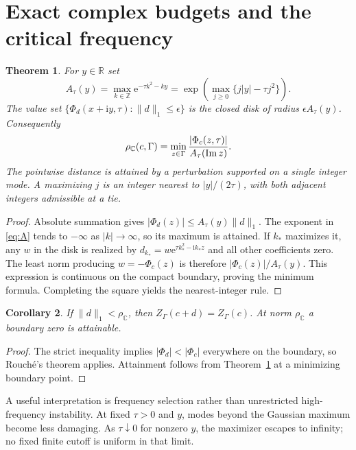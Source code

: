 \documentclass[11pt]{article}
\newtheorem{theorem}{Theorem}\newtheorem{proposition}[theorem]{Proposition}\newtheorem{corollary}[theorem]{Corollary}\newtheorem{lemma}[theorem]{Lemma}
\newcommand{\C}{\mathbb C}\newcommand{\R}{\mathbb R}\newcommand{\Z}{\mathbb Z}\newcommand{\e}{\mathrm e}\newcommand{\ii}{\mathrm i}\newcommand{\dd}{\,\mathrm d}
\begin{document}
\section{Exact complex budgets and the critical frequency}
\begin{theorem}\label{thm:complex}
For $y\in\R$ set
\begin{equation}\label{eq:A}
 A_\tau(y)=\max_{k\in\Z}\e^{-\tau k^2-ky}
 =\exp\!\left(\max_{j\ge0}\{j|y|-\tau j^2\}\right).
\end{equation}
The value set $\{\Phi_d(x+\ii y,\tau):\|d\|_1\le\epsilon\}$ is the closed disk of radius $\epsilon A_\tau(y)$. Consequently
\begin{equation}\label{eq:complexradius}
 \rho_\C(c,\Gamma)=\min_{z\in\Gamma}\frac{|\Phi_c(z,\tau)|}{A_\tau(\Ima z)}.
\end{equation}
The pointwise distance is attained by a perturbation supported on a single integer mode. A maximizing $j$ is an integer nearest to $|y|/(2\tau)$, with both adjacent integers admissible at a tie.
\end{theorem}
\begin{proof}
Absolute summation gives $|\Phi_d(z)|\le A_\tau(y)\|d\|_1$. The exponent in \eqref{eq:A} tends to $-\infty$ as $|k|\to\infty$, so its maximum is attained. If $k_*$ maximizes it, any $w$ in the disk is realized by $d_{k_*}=w\e^{\tau k_*^2-\ii k_*z}$ and all other coefficients zero. The least norm producing $w=-\Phi_c(z)$ is therefore $|\Phi_c(z)|/A_\tau(y)$. This expression is continuous on the compact boundary, proving the minimum formula. Completing the square yields the nearest-integer rule.
\end{proof}
\begin{corollary}\label{cor:complexcount}
If $\|d\|_1<\rho_\C$, then $Z_\Gamma(c+d)=Z_\Gamma(c)$. At norm $\rho_\C$ a boundary zero is attainable.
\end{corollary}
\begin{proof}
The strict inequality implies $|\Phi_d|<|\Phi_c|$ everywhere on the boundary, so Rouch\'e's theorem applies. Attainment follows from Theorem~\ref{thm:complex} at a minimizing boundary point.
\end{proof}
A useful interpretation is frequency selection rather than unrestricted high-frequency instability. At fixed $\tau>0$ and $y$, modes beyond the Gaussian maximum become less damaging. As $\tau\downarrow0$ for nonzero $y$, the maximizer escapes to infinity; no fixed finite cutoff is uniform in that limit.
\end{document}
